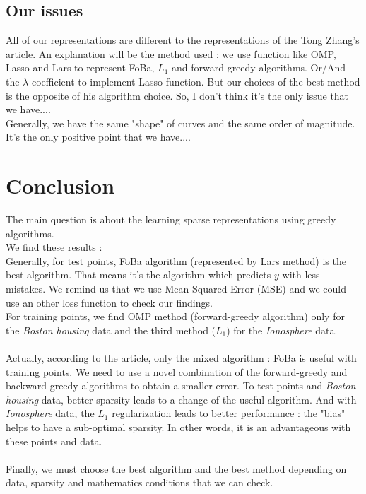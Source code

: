 \documentclass{article}
\begin{document}
\subsection{Our issues}
All of our representations are different to the representations of the Tong Zhang's article. An explanation will be the method used : we use function like OMP, Lasso and Lars to represent FoBa, $L_1$ and forward greedy algorithms. Or/And the $\lambda$ coefficient to implement Lasso function. But our choices of the best method is the opposite of his algorithm choice. So, I don't think it's the only issue that we have....\\
Generally, we have the same "shape" of curves and the same order of magnitude. It's the only positive point that we have....


\section*{Conclusion}
The main question is about the learning sparse representations using greedy algorithms.\\
We find these results :\\
Generally, for test points, FoBa algorithm (represented by Lars method) is the best algorithm. That means it's the algorithm which predicts $y$ with less mistakes. We remind us that we use Mean Squared Error (MSE) and we could use an other loss function to check our findings.\\
For training points, we find OMP method (forward-greedy algorithm) only for the \textit{Boston housing} data and the third method ($L_1$) for the \textit{Ionosphere} data.\\
\\
Actually, according to the article, only the mixed algorithm : FoBa is useful with training points. We need to use a novel combination of the forward-greedy and backward-greedy algorithms to obtain a smaller error. To test points and \textit{Boston housing} data, better sparsity leads to a change of the useful algorithm. And with \textit{Ionosphere} data, the $L_1$ regularization leads to better performance : the "bias" helps to have a sub-optimal sparsity. In other words, it is an advantageous with these points and data. \\
\\
Finally, we must choose the best algorithm and the best method depending on data, sparsity and mathematics conditions that we can check.
\end{document}
